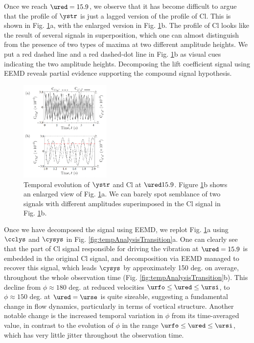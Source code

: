 \documentclass[a4paper,fleqn]{cas-sc}
\begin{document}
Once we reach $\ured = 15.9$, we observe that it has become difficult to argue that the profile of $\ystr$ is just a lagged version of the profile of Cl. This is shown in Fig. \ref{fig:tempEvoCompare}a, with the enlarged version in Fig. \ref{fig:tempEvoCompare}b. The profile of Cl looks like the result of several signals in superposition, which one can almost distinguish from the presence of two types of maxima at two different amplitude heights. We put a red dashed line and a red dashed-dot line in Fig. \ref{fig:tempEvoCompare}b as visual cues indicating the two amplitude heights. Decomposing the lift coefficient signal using EEMD reveals partial evidence supporting the compound signal hypothesis.

\begin{figure}
  \centering
  \includegraphics[width=0.4\textwidth]{figs/figure15}
  \caption{Temporal evolution of $\ystr$ and Cl at $\ured 15.9$. Figure \ref{fig:tempEvoCompare}b shows an enlarged view of Fig. \ref{fig:tempEvoCompare}a. We can barely spot semblance of two signals with different amplitudes superimposed in the Cl signal in Fig. \ref{fig:tempEvoCompare}b.} \label{fig:tempEvoCompare}
\end{figure}

Once we have decomposed the signal using EEMD, we replot Fig. \ref{fig:tempEvoCompare}a using $\cclys$ and $\cysys$ in Fig. \ref{fig:tempAnalysisTransition}a. One can clearly see that the part of Cl signal responsible for driving the vibration at  $\ured = 15.9$ is embedded in the original Cl signal, and decomposition via EEMD managed to recover this signal, which leads $\cysys$ by approximately 150 deg. on average, throughout the whole observation time (Fig. \ref{fig:tempAnalysisTransition}b). This decline from $\phi \approx 180$ deg. at reduced velocities $\urfo \leq \ured \leq \ursi$, to $\phi \approx 150$ deg. at $\ured = \urse$ is quite sizeable, suggesting a fundamental change in flow dynamics, particularly in terms of vortical structure. Another notable change is the increased temporal variation in $\phi$ from its time-averaged value, in contrast to the evolution of $\phi$ in the range $\urfo \leq \ured \leq \ursi$, which has very little jitter throughout the observation time.
\end{document}
